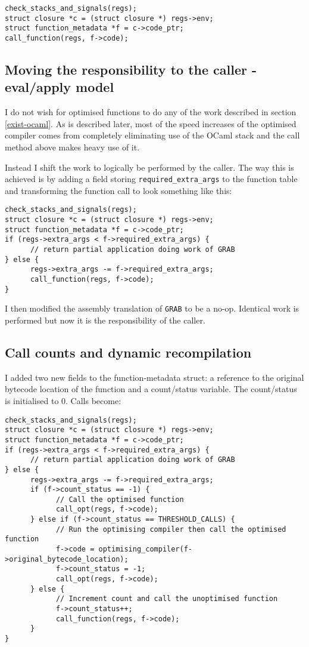 \begin{verbatim}
check_stacks_and_signals(regs);
struct closure *c = (struct closure *) regs->env;
struct function_metadata *f = c->code_ptr;
call_function(regs, f->code);
\end{verbatim}

\subsection{Moving the responsibility to the caller - eval/apply model}

I do not wish for optimised functions to do any of the work described in section \ref{exist-ocaml}.
As is described later, most of the speed increases of the optimised compiler comes from completely
eliminating use of the OCaml stack and the call method above makes heavy use of it.

Instead I shift the work to logically be performed by the caller. The way this is achieved is by
adding a
field storing \texttt{required\_extra\_args} to the function table and transforming the function
call to look something like this:

\begin{verbatim}
check_stacks_and_signals(regs);
struct closure *c = (struct closure *) regs->env;
struct function_metadata *f = c->code_ptr;
if (regs->extra_args < f->required_extra_args) {
      // return partial application doing work of GRAB
} else {
      regs->extra_args -= f->required_extra_args;
      call_function(regs, f->code);
}
\end{verbatim}

I then modified the assembly translation of \texttt{GRAB} to be a no-op. Identical work is
performed but now it is the responsibility of the caller.

\subsection{Call counts and dynamic recompilation} \label{final-call-logic}

I added two new fields to the function-metadata struct: a reference to the original bytecode
location
of the function and a count/status variable.  The count/status is initialised to 0. Calls become:

\begin{verbatim}
check_stacks_and_signals(regs);
struct closure *c = (struct closure *) regs->env;
struct function_metadata *f = c->code_ptr;
if (regs->extra_args < f->required_extra_args) {
      // return partial application doing work of GRAB
} else { 
      regs->extra_args -= f->required_extra_args;
      if (f->count_status == -1) {
            // Call the optimised function
            call_opt(regs, f->code);
      } else if (f->count_status == THRESHOLD_CALLS) {
            // Run the optimising compiler then call the optimised function
            f->code = optimising_compiler(f->original_bytecode_location);
            f->count_status = -1;
            call_opt(regs, f->code);
      } else {
            // Increment count and call the unoptimised function 
            f->count_status++;
            call_function(regs, f->code);
      }
}
\end{verbatim}

